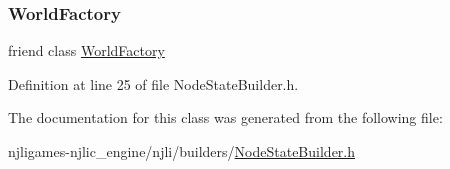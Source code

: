 \subsubsection{\texorpdfstring{World\+Factory}{WorldFactory}}
{\footnotesize\ttfamily friend class \mbox{\hyperlink{classnjli_1_1_world_factory}{World\+Factory}}\hspace{0.3cm}{\ttfamily [friend]}}



Definition at line 25 of file Node\+State\+Builder.\+h.



The documentation for this class was generated from the following file\+:\begin{DoxyCompactItemize}
\item 
njligames-\/njlic\+\_\+engine/njli/builders/\mbox{\hyperlink{_node_state_builder_8h}{Node\+State\+Builder.\+h}}\end{DoxyCompactItemize}
